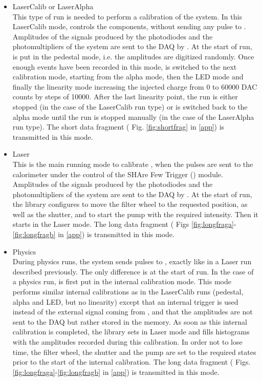 \begin{itemize}
\item{LaserCalib or LaserAlpha}~\\
This type of run is needed to perform a calibration of the \lasii{} system. In this
LaserCalib mode, \lascar{} controls the \lasii{} components, without sending any
\las{} pulse to \tilecal{}. Amplitudes of the signals produced by the photodiodes
and the photomultipliers of the \lasii{} system are sent to the \atlas{} DAQ by \lascar{}.
At the start of run, \lascar{} is put in the pedestal mode, i.e. the amplitudes
are digitized randomly. Once enough events have been recorded in this mode,
\lascar{} is switched to the next calibration mode, starting from the alpha mode, then the
LED mode and finally the linearity mode increasing the injected charge from 0 to 60000 DAC counts by steps
of 10000. After the last linearity point, the run is either stopped (in the case of the
LaserCalib run type) or \lascar{} is switched back to the alpha mode until the run is stopped
manually (in the case of the LaserAlpha run type). The short data fragment ( Fig. \ref{fig:shortfrag} in \ref{app}) is transmitted in this mode.


\item{Laser}~\\
This is the main running mode to calibrate \tilecal{}, when the \las{} pulses are sent to the
calorimeter under the control of the SHAre Few Trigger (\shaft) module. Amplitudes of the signals produced by the 
photodiodes and the photomultipliers of the \lasii{} system are sent to the \atlas{} DAQ by 
\lascar{}. At the start of run, the \lasmodule{} library configures \lascar{} to move the filter
wheel to the requested position, as well as the shutter, and to start the \las{} pump with the 
required intensity. Then it starts \lascar{} in the Laser mode. The long data fragment ( Figs \ref{fig:longfraga}-\ref{fig:longfragb} in \ref{app}) is transmitted in this mode.

\item{Physics}~\\
During physics runs, the \lasii{} system sends \las{} pulses to \tilecal{}, exactly like in
a Laser run described previously. The only difference is at the start of run. In the case of
a physics run, \lascar{} is first put in the internal calibration mode. This mode performs
similar internal calibrations as in the LaserCalib runs (pedestal, alpha and LED, but no
linearity) except that an internal trigger is used instead of the external signal coming from
\shaft{}, and that the amplitudes are not sent to the \atlas{} DAQ but rather stored in the 
\lascar{} memory. As soon as this internal calibration is completed, the \lasmodule{} library
sets \lascar{} in Laser mode and fills histograms with the amplitudes recorded during this
calibration. In order not to lose time, the filter wheel, the shutter and the \las{} pump
are set to the required states prior to the start of the internal calibration. The long data fragment ( Figs. \ref{fig:longfraga}-\ref{fig:longfragb} in \ref{app}) is transmitted in this mode.


\end{itemize}
